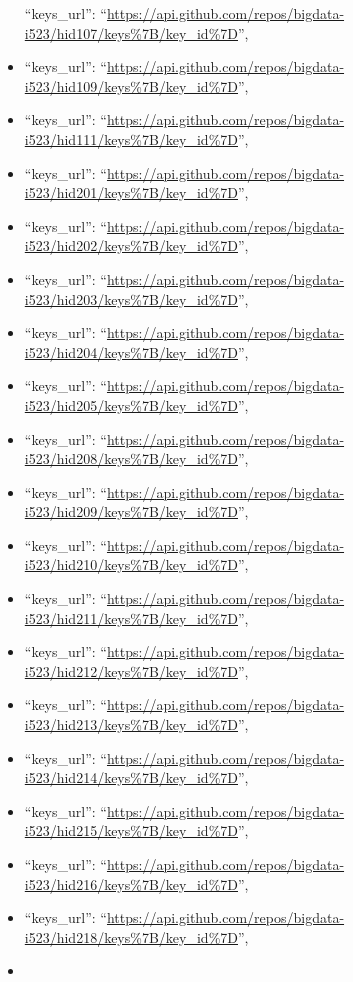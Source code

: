 \begin{itemize}
  ``keys\_url'':
  ``\url{https://api.github.com/repos/bigdata-i523/hid107/keys\%7B/key_id\%7D}'',
\item
  ``keys\_url'':
  ``\url{https://api.github.com/repos/bigdata-i523/hid109/keys\%7B/key_id\%7D}'',
\item
  ``keys\_url'':
  ``\url{https://api.github.com/repos/bigdata-i523/hid111/keys\%7B/key_id\%7D}'',
\item
  ``keys\_url'':
  ``\url{https://api.github.com/repos/bigdata-i523/hid201/keys\%7B/key_id\%7D}'',
\item
  ``keys\_url'':
  ``\url{https://api.github.com/repos/bigdata-i523/hid202/keys\%7B/key_id\%7D}'',
\item
  ``keys\_url'':
  ``\url{https://api.github.com/repos/bigdata-i523/hid203/keys\%7B/key_id\%7D}'',
\item
  ``keys\_url'':
  ``\url{https://api.github.com/repos/bigdata-i523/hid204/keys\%7B/key_id\%7D}'',
\item
  ``keys\_url'':
  ``\url{https://api.github.com/repos/bigdata-i523/hid205/keys\%7B/key_id\%7D}'',
\item
  ``keys\_url'':
  ``\url{https://api.github.com/repos/bigdata-i523/hid208/keys\%7B/key_id\%7D}'',
\item
  ``keys\_url'':
  ``\url{https://api.github.com/repos/bigdata-i523/hid209/keys\%7B/key_id\%7D}'',
\item
  ``keys\_url'':
  ``\url{https://api.github.com/repos/bigdata-i523/hid210/keys\%7B/key_id\%7D}'',
\item
  ``keys\_url'':
  ``\url{https://api.github.com/repos/bigdata-i523/hid211/keys\%7B/key_id\%7D}'',
\item
  ``keys\_url'':
  ``\url{https://api.github.com/repos/bigdata-i523/hid212/keys\%7B/key_id\%7D}'',
\item
  ``keys\_url'':
  ``\url{https://api.github.com/repos/bigdata-i523/hid213/keys\%7B/key_id\%7D}'',
\item
  ``keys\_url'':
  ``\url{https://api.github.com/repos/bigdata-i523/hid214/keys\%7B/key_id\%7D}'',
\item
  ``keys\_url'':
  ``\url{https://api.github.com/repos/bigdata-i523/hid215/keys\%7B/key_id\%7D}'',
\item
  ``keys\_url'':
  ``\url{https://api.github.com/repos/bigdata-i523/hid216/keys\%7B/key_id\%7D}'',
\item
  ``keys\_url'':
  ``\url{https://api.github.com/repos/bigdata-i523/hid218/keys\%7B/key_id\%7D}'',
\item

\end{itemize}
